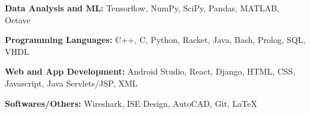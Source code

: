 \begin{cventries}
  \cventry
    {}
    {}
    {}
    {}
    {
    \vspace{-0.3cm}
      \begin{cvitems}
        \item{\textbf{Data Analysis and ML:} \hspace{14.5mm}  Tensorflow, NumPy, SciPy, Pandas, MATLAB, Octave}
        \vspace{0.5mm}
        \item {\textbf{Programming Languages:} \hspace{0.9cm} C++, C, Python, Racket, Java, Bash, Prolog, SQL, VHDL}
        \vspace{0.5mm}
        \item{\textbf{Web and App Development:} \hspace{4mm} Android Studio, React, Django, HTML, CSS, Javascript, Java Servlets/JSP, XML}
        \vspace{0.5mm}
        \item{\textbf{Softwares/Others:}  \hspace{2cm}  Wireshark, ISE Design, AutoCAD, Git, \LaTeX}
      \end{cvitems}
    }
\end{cventries}